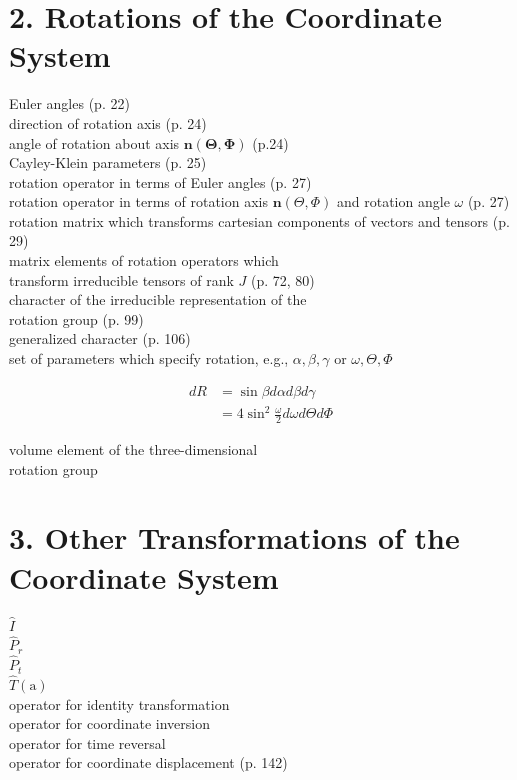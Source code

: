 \section*{2. Rotations of the Coordinate System}
Euler angles (p. 22)\\
direction of rotation axis (p. 24)\\
angle of rotation about axis $\mathbf{n}(\boldsymbol{\Theta}, \boldsymbol{\Phi})$ (p.24)\\
Cayley-Klein parameters (p. 25)\\
rotation operator in terms of Euler angles (p. 27)\\
rotation operator in terms of rotation axis $\mathbf{n}(\Theta, \Phi)$ and rotation angle $\omega$ (p. 27)\\
rotation matrix which transforms cartesian components of vectors and tensors (p. 29)\\
matrix elements of rotation operators which\\
transform irreducible tensors of rank $J$ (p. 72, 80)\\
character of the irreducible representation of the\\
rotation group (p. 99)\\
generalized character (p. 106)\\
set of parameters which specify rotation, e.g., $\alpha, \beta, \gamma$ or $\omega, \Theta, \Phi$

$$
\begin{aligned}
d R & =\sin \beta d \alpha d \beta d \gamma \\
& =4 \sin ^{2} \frac{\omega}{2} d \omega d \Theta d \Phi
\end{aligned}
$$

volume element of the three-dimensional\\
rotation group

\section*{3. Other Transformations of the Coordinate System}
$\widehat{I}$\\
$\widehat{P}_{r}$\\
$\widehat{P}_{t}$\\
$\widehat{T}(\mathrm{a})$\\
operator for identity transformation\\
operator for coordinate inversion\\
operator for time reversal\\
operator for coordinate displacement (p. 142)


